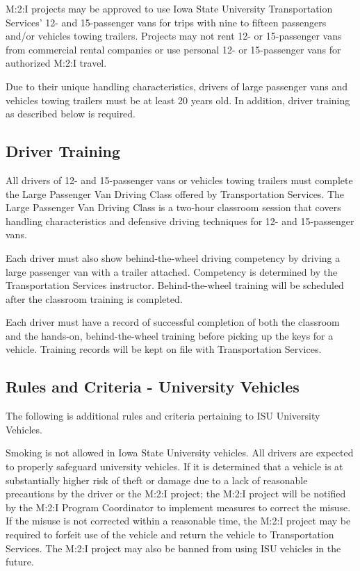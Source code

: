{M:2:I projects may be approved to use Iowa State University Transportation Services' 12- and 15-passenger vans for trips with nine to fifteen passengers and/or vehicles towing trailers. Projects may not rent 12- or 15-passenger vans from commercial rental companies or use personal 12- or 15-passenger vans for authorized M:2:I travel.

Due to their unique handling characteristics, drivers of large passenger vans and vehicles towing trailers must be at least 20 years old. In addition, driver training as described below is required.

\subsection{Driver Training}

All drivers of 12- and 15-passenger vans or vehicles towing trailers must complete the Large Passenger Van Driving Class offered by Transportation Services. The Large Passenger Van Driving Class is a two-hour classroom session that covers handling characteristics and defensive driving techniques for 12- and 15-passenger vans.

Each driver must also show behind-the-wheel driving competency by driving a large passenger van with a trailer attached. Competency is determined by the Transportation Services instructor. Behind-the-wheel training will be scheduled after the classroom training is completed.

Each driver must have a record of successful completion of both the classroom and the hands-on, behind-the-wheel training before picking up the keys for a vehicle.  Training records will be kept on file with Transportation Services.

\subsection{Rules and Criteria - University Vehicles}\label{ISU_Vehicle_Criteria}

The following is additional rules and criteria pertaining to ISU University Vehicles.

Smoking is not allowed in Iowa State University vehicles.  All drivers are expected to properly safeguard university vehicles. If it is determined that a vehicle is at substantially higher risk of theft or damage due to a lack of reasonable precautions by the driver or the M:2:I project; the M:2:I project will be notified by the M:2:I Program Coordinator to implement measures to correct the misuse. If the misuse is not corrected within a reasonable time, the M:2:I project may be required to forfeit use of the vehicle and return the vehicle to Transportation Services.  The M:2:I project may also be banned from using ISU vehicles in the future.

}
